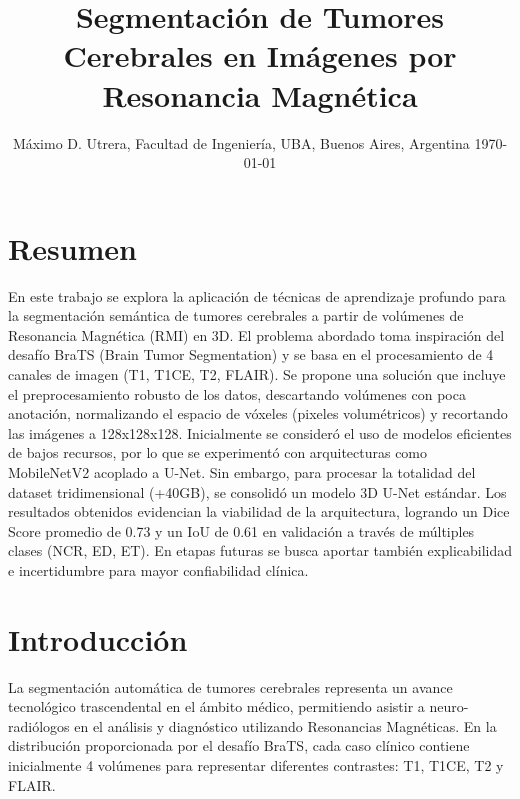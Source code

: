 \title{\textbf{Segmentación de Tumores Cerebrales en Imágenes por Resonancia Magnética}}
\author{\small Máximo D. Utrera, Facultad de Ingeniería, UBA, Buenos Aires, Argentina \hfill \small \today}
\date{}

\twocolumn[
\begin{@twocolumnfalse}
  \maketitle
  \thispagestyle{fancy}
\end{@twocolumnfalse}
]

\section*{Resumen}

En este trabajo se explora la aplicación de técnicas de aprendizaje profundo para la segmentación semántica de tumores cerebrales a partir de volúmenes de Resonancia Magnética (RMI) en 3D. El problema abordado toma inspiración del desafío BraTS (Brain Tumor Segmentation) y se basa en el procesamiento de 4 canales de imagen (T1, T1CE, T2, FLAIR). Se propone una solución que incluye el preprocesamiento robusto de los datos, descartando volúmenes con poca anotación, normalizando el espacio de vóxeles (pixeles volumétricos) y recortando las imágenes a 128x128x128. Inicialmente se consideró el uso de modelos eficientes de bajos recursos, por lo que se experimentó con arquitecturas como MobileNetV2 acoplado a U-Net. Sin embargo, para procesar la totalidad del dataset tridimensional (+40GB), se consolidó un modelo 3D U-Net estándar. Los resultados obtenidos evidencian la viabilidad de la arquitectura, logrando un Dice Score promedio de 0.73 y un IoU de 0.61 en validación a través de múltiples clases (NCR, ED, ET). En etapas futuras se busca aportar también explicabilidad e incertidumbre para mayor confiabilidad clínica.
\vspace{0.25cm}

\section{Introducción}

La segmentación automática de tumores cerebrales representa un avance tecnológico trascendental en el ámbito médico, permitiendo asistir a neuro-radiólogos en el análisis y diagnóstico utilizando Resonancias Magnéticas. En la distribución proporcionada por el desafío BraTS, cada caso clínico contiene inicialmente 4 volúmenes para representar diferentes contrastes: T1, T1CE, T2 y FLAIR.


